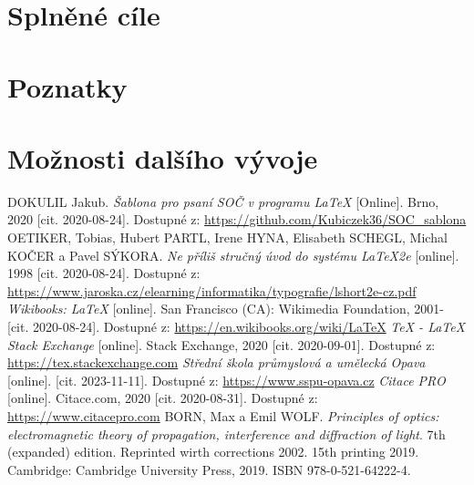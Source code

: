 \documentclass[12pt, a4paper,
twoside,        %
openright
]{report}
\let\oldchapter\chapter
\renewcommand{\chapter}{
	\clearpage
	\pagestyle{fancy}
	\oldchapter
}
\begin{document}
\section{Splněné cíle}

\section{Poznatky}

\section{Možnosti dalšího vývoje}




	
	\begin{thebibliography}{99}
		 DOKULIL Jakub. \textit{Šablona pro psaní SOČ v programu \LaTeX} [Online]. Brno, 2020 [cit. 2020-08-24]. Dostupné z: \url{https://github.com/Kubiczek36/SOC_sablona}
		OETIKER, Tobias, Hubert PARTL, Irene HYNA, Elisabeth SCHEGL, Michal KOČER a Pavel SÝKORA. \textit{Ne příliš stručný úvod do systému LaTeX2e} [online]. 1998 [cit. 2020-08-24]. Dostupné z: \url{https://www.jaroska.cz/elearning/informatika/typografie/lshort2e-cz.pdf}
		\textit{Wikibooks: LaTeX} [online]. San Francisco (CA): Wikimedia Foundation, 2001- [cit. 2020-08-24]. Dostupné z: \url{https://en.wikibooks.org/wiki/LaTeX}
		 \textit{TeX - LaTeX Stack Exchange} [online]. Stack Exchange, 2020 [cit. 2020-09-01]. Dostupné z: \url{https://tex.stackexchange.com}
		 \textit{Střední škola průmyslová a umělecká Opava} [online]. [cit. 2023-11-11]. Dostupné z: \url{https://www.sspu-opava.cz}
		\textit{Citace PRO} [online]. Citace.com, 2020 [cit. 2020-08-31]. Dostupné z: \url{https://www.citacepro.com}
		 BORN, Max a Emil WOLF. \textit{Principles of optics: electromagnetic theory of propagation, interference and diffraction of light}. 7th (expanded) edition. Reprinted wirth corrections 2002. 15th printing 2019. Cambridge: Cambridge University Press, 2019. ISBN 978-0-521-64222-4.
	\end{thebibliography}
	
	\listoffigures
	
	\listoftables
	
	\appendix %
	
	\titleformat{\chapter}[block]{\scshape\bfseries\LARGE}{Příloha \thechapter}{10pt}{\vspace{0pt}}[\vspace{-22pt}] %
	

	
	
\end{document}
